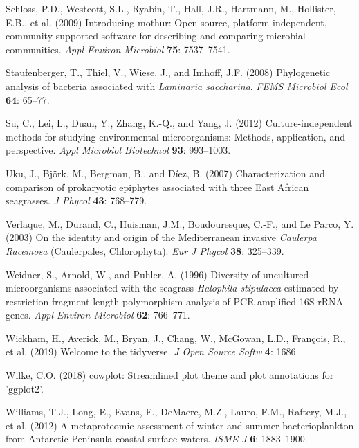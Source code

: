 \documentclass[
  12pt,
]{article}
\begin{document}
\leavevmode\hypertarget{ref-Schloss2009}{}%
Schloss, P.D., Westcott, S.L., Ryabin, T., Hall, J.R., Hartmann, M.,
Hollister, E.B., et al. (2009) Introducing mothur: Open-source,
platform-independent, community-supported software for describing and
comparing microbial communities. \emph{Appl Environ Microbiol}
\textbf{75}: 7537--7541.

\leavevmode\hypertarget{ref-Staufenberger2008}{}%
Staufenberger, T., Thiel, V., Wiese, J., and Imhoff, J.F. (2008)
Phylogenetic analysis of bacteria associated with \emph{Laminaria
saccharina}. \emph{FEMS Microbiol Ecol} \textbf{64}: 65--77.

\leavevmode\hypertarget{ref-Su2012}{}%
Su, C., Lei, L., Duan, Y., Zhang, K.-Q., and Yang, J. (2012)
Culture-independent methods for studying environmental microorganisms:
Methods, application, and perspective. \emph{Appl Microbiol Biotechnol}
\textbf{93}: 993--1003.

\leavevmode\hypertarget{ref-Uku2007}{}%
Uku, J., Björk, M., Bergman, B., and Díez, B. (2007) Characterization
and comparison of prokaryotic epiphytes associated with three East
African seagrasses. \emph{J Phycol} \textbf{43}: 768--779.

\leavevmode\hypertarget{ref-Verlaque2003}{}%
Verlaque, M., Durand, C., Huisman, J.M., Boudouresque, C.-F., and Le
Parco, Y. (2003) On the identity and origin of the Mediterranean
invasive \emph{Caulerpa} \emph{Racemosa} (Caulerpales, Chlorophyta).
\emph{Eur J Phycol} \textbf{38}: 325--339.

\leavevmode\hypertarget{ref-Weidner1996}{}%
Weidner, S., Arnold, W., and Puhler, A. (1996) Diversity of uncultured
microorganisms associated with the seagrass \emph{Halophila stipulacea}
estimated by restriction fragment length polymorphism analysis of
PCR-amplified 16S rRNA genes. \emph{Appl Environ Microbiol} \textbf{62}:
766--771.

\leavevmode\hypertarget{ref-Wickham2019}{}%
Wickham, H., Averick, M., Bryan, J., Chang, W., McGowan, L.D., François,
R., et al. (2019) Welcome to the tidyverse. \emph{J Open Source Softw}
\textbf{4}: 1686.

\leavevmode\hypertarget{ref-Wilke2018}{}%
Wilke, C.O. (2018) cowplot: Streamlined plot theme and plot annotations
for 'ggplot2'.

\leavevmode\hypertarget{ref-Williams2012}{}%
Williams, T.J., Long, E., Evans, F., DeMaere, M.Z., Lauro, F.M.,
Raftery, M.J., et al. (2012) A metaproteomic assessment of winter and
summer bacterioplankton from Antarctic Peninsula coastal surface waters.
\emph{ISME J} \textbf{6}: 1883--1900.
\end{document}
